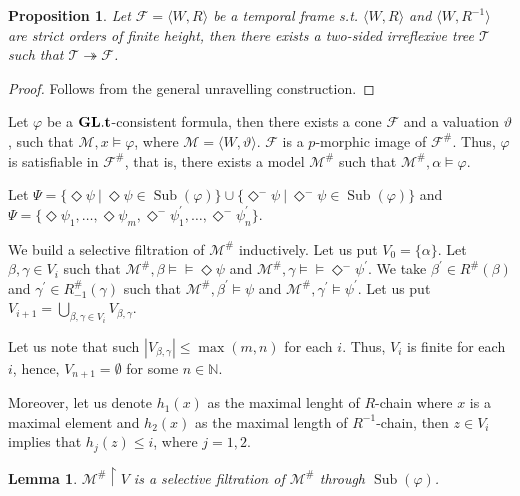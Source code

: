 \documentclass[a4paper]{article}
\theoremstyle{defin}
\theoremstyle{theorem}
\theoremstyle{prop}
\newtheorem{prop}{Proposition}
\theoremstyle{lemma}
\newtheorem{lemma}{Lemma}
\theoremstyle{ex}
\theoremstyle{col}
\newcommand{\DiamondM}{\Diamond^{-}}
\begin{document}
\begin{prop} Let $\mathcal{F} = \langle W, R \rangle$ be a temporal frame s.t. $\langle W, R \rangle$ and $\langle W, R^{-1} \rangle$ are strict orders of finite height, then there exists a two-sided irreflexive tree $\mathcal{T}$ such that $\mathcal{T} \twoheadrightarrow \mathcal{F}$.
\end{prop}

\begin{proof}
  Follows from the general unravelling construction.
\end{proof}

Let $\varphi$ be a ${\bf GL}.{\bf t}$-consistent formula, then there exists a cone $\mathcal{F}$ and a valuation $\vartheta$, such that $\mathcal{M}, x \models \varphi$, where $\mathcal{M} = \langle W, \vartheta \rangle$. $\mathcal{F}$ is a $p$-morphic image of $\mathcal{F}^{\#}$.
Thus, $\varphi$ is satisfiable in $\mathcal{F}^{\#}$, that is, there exists a model $\mathcal{M}^{\#}$ such that $\mathcal{M}^{\#}, \alpha \models \varphi$.

Let $\Psi = \{ \Diamond \psi \: | \: \Diamond \psi \in \operatorname{Sub}(\varphi)\} \cup \{ \DiamondM \psi \: | \: \DiamondM \psi \in
\operatorname{Sub}(\varphi)\}$ and $\Psi = \{ \Diamond \psi_1, \dots, \Diamond \psi_m, \DiamondM \psi^{'}_1, \dots, \DiamondM \psi^{'}_n \}$.

We build a selective filtration of $\mathcal{M}^{\#}$ inductively. Let us put $V_0 = \{ \alpha \}$. Let $\beta, \gamma \in V_i$ such that $\mathcal{M}^{\#}, \beta \models \models \Diamond \psi$ and $\mathcal{M}^{\#}, \gamma \models \models \DiamondM \psi^{'}$.
We take $\beta^{'} \in R^{\#}(\beta)$ and $\gamma^{'} \in R^{\#}_{-1}(\gamma)$ such that $\mathcal{M}^{\#}, \beta^{'} \models \psi$ and $\mathcal{M}^{\#}, \gamma^{'} \models \psi^{'}$.
Let us put $V_{i + 1} = \bigcup \limits_{\beta, \gamma \in V_i} V_{\beta, \gamma}$.

Let us note that such $|V_{\beta, \gamma}| \leq \operatorname{max}(m,n)$ for each $i$. Thus, $V_i$ is finite for each $i$, hence, $V_{n + 1} = \emptyset$ for some $n \in \mathbb{N}$.

Moreover, let us denote $h_1(x)$ as the maximal lenght of $R$-chain where $x$ is a maximal element and $h_2(x)$ as the maximal length of $R^{-1}$-chain, then $z \in V_i$ implies that $h_j(z) \leq i$, where $j = 1,2$.

\begin{lemma}
  $\mathcal{M}^{\#} \upharpoonright V$ is a selective filtration of $\mathcal{M}^{\#}$ through $\operatorname{Sub}(\varphi)$.
\end{lemma}
\end{document}
